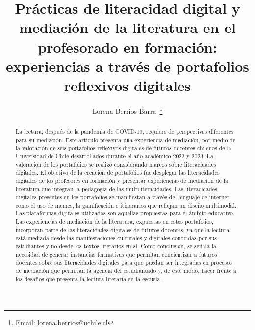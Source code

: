 \documentclass[spanish]{textolivre}
\title{Prácticas de literacidad digital y mediación de la literatura en el profesorado en formación: experiencias a través de portafolios reflexivos digitales}
\author[1]{Lorena Berríos Barra~\orcid{0000-0003-3698-1712}\thanks{Email: \href{mailto:lorena.berrios@uchile.cl}{lorena.berrios@uchile.cl}}}
\affil[1]{Universidad de Chile, Departamento de Estudios Pedagógicos de la Facultad de Filosofía y Humanidades, Santiago, Ñuñoa, Chile.}
\begin{document}
\maketitle

\begin{polyabstract}
\begin{abstract}
La lectura, después de la pandemia de COVID-19, requiere de perspectivas
diferentes para su mediación. Este artículo presenta una experiencia de
mediación, por medio de la valoración de seis portafolios reflexivos
digitales de futuros docentes chilenos de la Universidad de Chile
desarrollados durante el año académico 2022 y 2023. La valoración de los
portafolios se realizó considerando marcos sobre literacidades
digitales. El objetivo de la creación de portafolios fue desplegar las
literacidades digitales de los profesores en formación y presentar
experiencias de mediación de la literatura que integran la pedagogía de
las multiliteracidades. Las literacidades digitales presentes en los
portafolios se manifiestan a través del lenguaje de internet como el uso
de memes, la gamificación e itinerarios que reflejan un diseño
multimodal. Las plataformas digitales utilizadas son aquellas propuestas
para el ámbito educativo. Las experiencias de mediación de la
literatura, expuestas en estos portafolios, incorporan parte de las
literacidades digitales de futuros docentes, ya que la lectura está
mediada desde las manifestaciones culturales y digitales conocidas por
sus estudiantes y no desde los textos literarios en sí. Como conclusión,
se señala la necesidad de generar instancias formativas que permitan
concientizar a futuros docentes sobre sus literacidades digitales para
que puedan ser integradas en procesos de mediación que permitan la
agencia del estudiantado y, de este modo, hacer frente a los desafíos
que presenta la lectura literaria en la escuela.

\end{abstract}


\end{polyabstract}
\end{document}
